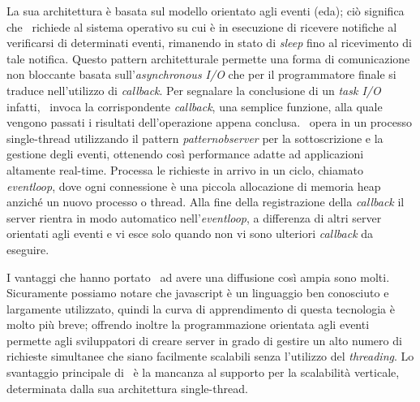 La sua architettura è basata sul modello orientato agli eventi (\acrshort{eda}); ciò significa che \nodejs~richiede al sistema operativo su cui è in esecuzione di ricevere notifiche al verificarsi di determinati eventi, rimanendo in stato di \textit{sleep} fino al ricevimento di tale notifica. Questo pattern architetturale permette una forma di comunicazione non bloccante basata sull'\textit{asynchronous I/O} che per il programmatore finale si traduce nell'utilizzo di \textit{\gls{callback}}. Per segnalare la conclusione di un \textit{task I/O} infatti, \nodejs~invoca la corrispondente \textit{\gls{callback}}, una semplice funzione, alla quale vengono passati i risultati dell'operazione appena conclusa.
\nodejs~opera in un processo single-thread utilizzando il pattern \textit{\acrshort{patternobserver}} per la sottoscrizione e la gestione degli eventi, ottenendo così performance adatte ad applicazioni altamente real-time. Processa le richieste in arrivo in un ciclo, chiamato \textit{\gls{eventloop}}, dove ogni connessione è una piccola allocazione di memoria heap anziché un nuovo processo o thread. Alla fine della registrazione della \textit{\gls{callback}} il server rientra in modo automatico nell'\textit{\gls{eventloop}}, a differenza di altri server orientati agli eventi e vi esce solo quando non vi sono ulteriori \textit{\gls{callback}} da eseguire.

I vantaggi che hanno portato \nodejs~ad avere una diffusione così ampia sono molti. Sicuramente possiamo notare che \gls{javascript} è un linguaggio ben conosciuto e largamente utilizzato, quindi la curva di apprendimento di questa tecnologia è molto più breve; offrendo inoltre la programmazione orientata agli eventi permette agli sviluppatori di creare server in grado di gestire un alto numero di richieste simultanee che siano facilmente scalabili senza l'utilizzo del \textit{threading}. Lo svantaggio principale di \nodejs~è la mancanza al supporto per la scalabilità verticale, determinata dalla sua architettura single-thread.

